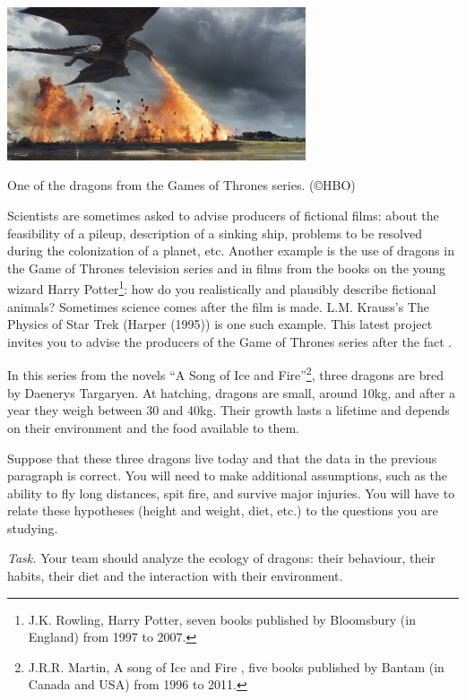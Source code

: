 \begin{center}
	\includegraphics*[width=250pt]{images/project-dragon.jpg}
	
	One of the dragons from the Games of Thrones series. (\copyright HBO)
\end{center}


Scientists are sometimes asked to advise producers of fictional films: about the feasibility of a pileup, description of a sinking ship, problems to be resolved during the colonization of a planet, etc. Another example is the use of dragons in the Game of Thrones television series and in films from the books on the young wizard Harry Potter\footnote{J.K. Rowling, Harry Potter, seven books published by Bloomsbury (in England) from 1997 to 2007.}: how do you realistically and plausibly describe fictional animals? Sometimes science comes after the film is made. L.M. Krauss's The Physics of Star Trek (Harper (1995)) is one such example. This latest project invites you to advise the producers of the Game of Thrones series after the fact .

In this series from the novels ``A Song of Ice and Fire''\footnote{J.R.R. Martin, A song of Ice and Fire , five books published by Bantam (in Canada and USA) from 1996 to 2011.}, three dragons are bred by Daenerys Targaryen. At hatching, dragons are small, around 10kg, and after a year they weigh between 30 and 40kg. Their growth lasts a lifetime and depends on their environment and the food available to them.

Suppose that these three dragons live today and that the data in the previous paragraph is correct. You will need to make additional assumptions, such as the ability to fly long distances, spit fire, and survive major injuries. You will have to relate these hypotheses (height and weight, diet, etc.) to the questions you are studying. 

\emph{Task.} Your team should analyze the ecology of dragons: their behaviour, their habits, their diet and the interaction with their environment. 

